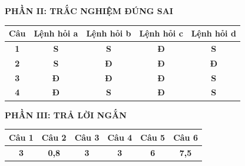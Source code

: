 \documentclass[11pt,a4paper]{article}
\begin{document}
\vspace{0.3cm}
\noindent\textbf{\color{mainGreen}PHẦN II: TRẮC NGHIỆM ĐÚNG SAI}
\begin{center}
\renewcommand{\arraystretch}{1.2}
\begin{tabular}{|c|c|c|c|c|}
\hline
\textbf{Câu} & \textbf{Lệnh hỏi a} & \textbf{Lệnh hỏi b} & \textbf{Lệnh hỏi c} & \textbf{Lệnh hỏi d} \\ \hline
\textbf{1} & \textbf{S} & \textbf{S} & \textbf{\color{red}Đ} & \textbf{S} \\ \hline
\textbf{2} & \textbf{S} & \textbf{\color{red}Đ} & \textbf{\color{red}Đ} & \textbf{\color{red}Đ} \\ \hline
\textbf{3} & \textbf{\color{red}Đ} & \textbf{\color{red}Đ} & \textbf{\color{red}Đ} & \textbf{S} \\ \hline
\textbf{4} & \textbf{\color{red}Đ} & \textbf{S} & \textbf{\color{red}Đ} & \textbf{S} \\ \hline
\end{tabular}
\end{center}

\vspace{0.3cm}
\noindent\textbf{\color{mainGreen}PHẦN III: TRẢ LỜI NGẮN}
\begin{center}
\renewcommand{\arraystretch}{1.2}
\begin{tabular}{|c|c|c|c|c|c|}
\hline
\textbf{Câu 1} & \textbf{Câu 2} & \textbf{Câu 3} & \textbf{Câu 4} & \textbf{Câu 5} & \textbf{Câu 6} \\ \hline
\textbf{\color{red}3} & \textbf{\color{red}0,8} & \textbf{\color{red}3} & \textbf{\color{red}3} & \textbf{\color{red}6} & \textbf{\color{red}7,5} \\ \hline
\end{tabular}
\end{center}
\end{document}
